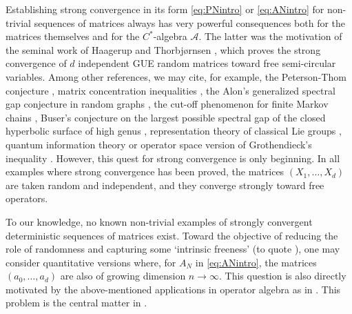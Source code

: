 \documentclass[11pt]{article}
\newcommand{\cA}{\mathcal{A}}
\newcommand{\1}{1\!\!{\sf I}}
\begin{document}
Establishing strong convergence in its form \eqref{eq:PNintro} or \eqref{eq:ANintro} for non-trivial sequences of matrices always has very powerful consequences both for the matrices themselves and for the $C^*$-algebra $\cA$. The latter was the motivation of the seminal work of Haagerup and Thorbj{\o}rnsen \cite{MR2183281}, which proves the strong convergence of $d$ independent GUE random matrices toward free semi-circular variables. Among other references, we may cite, for example, the Peterson-Thom conjecture \cite{MR2827095,MR4448584,belinschi2022strong},  matrix concentration inequalities \cite{bandeira2023matrix,brailovskaya2022universality}, the Alon's generalized spectral gap conjecture in random graphs \cite{MR4024563}, the cut-off phenomenon for finite Markov chains \cite{MR4476123}, Buser's conjecture on the largest possible spectral gap of the closed hyperbolic surface of high genus \cite{hide2023near,louder2023strongly}, representation theory of classical Lie groups \cite{BC2}, quantum information theory \cite{MR3452274,MR2995183} or operator space version of Grothendieck's inequality \cite{MR3273440}. However, this quest for strong convergence is only beginning. In all examples where strong convergence has been proved, the matrices $(X_1,\ldots,X_d)$ are taken random and independent, and they converge strongly toward free operators.



To our knowledge, no known non-trivial examples of strongly convergent deterministic sequences of matrices exist. Toward the objective of reducing the role of randomness and capturing some `intrinsic freeness' (to quote \cite{bandeira2023matrix}),  one may consider quantitative versions where, for $A_N$ in \eqref{eq:ANintro}, the matrices $(a_0,\ldots,a_d)$ are also of growing dimension $n \to \infty$. This question is also directly motivated by the above-mentioned applications in operator algebra as in \cite{MR3273440,MR4448584,belinschi2022strong}. This problem is the central matter in  \cite{MR3273440,MR4445344,MR4408503,bandeira2023matrix,brailovskaya2022universality,belinschi2022strong,parraud2023asymptotic}. 
\end{document}
